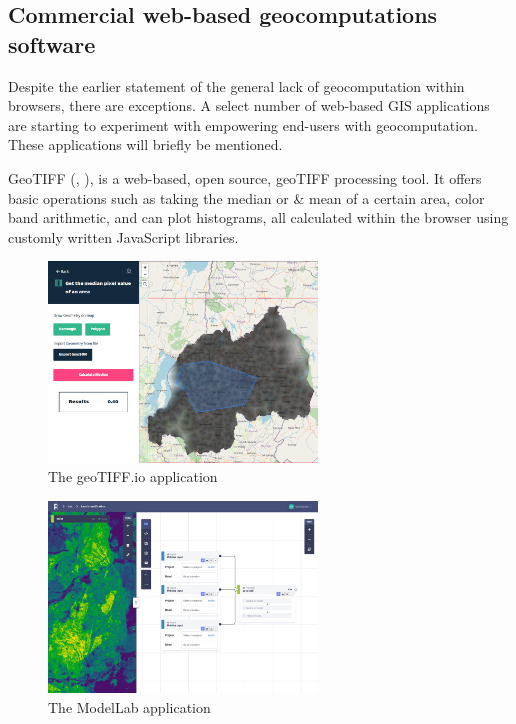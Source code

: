 \subsection{Commercial web-based geocomputations software}

Despite the earlier statement of the general lack of \ac{geocomputation} within browsers, there are exceptions. 
A select number of web-based \ac{GIS} applications are starting to experiment with empowering end-users with geocomputation. 
These applications will briefly be mentioned.
 
GeoTIFF (\citep{dufour_geotiffio_2022}, ), is a web-based, open source, geoTIFF processing tool. 
It offers basic operations such as taking the median or \& mean of a certain area, color band arithmetic, and can plot histograms, all calculated within the browser using customly written JavaScript libraries.

\begin{figure}
  \centering
  \graphicspath{ {../../assets/images/background/geo-web/} }
  \includegraphics[width=270px]{geotiff.png}
  \caption{The geoTIFF.io application \citep{dufour_geotiffio_2022}}
  \label{fig:geotiff}
\end{figure}

\begin{figure}
  \centering
  \graphicspath{ {../../assets/images/background/geo-web/} }
  \includegraphics[width=270px]{rasterfoundry-2.jpg}
  \caption{The ModelLab application \citep{azavea_geotrellis_2022}}
  \label{fig:modellab}
\end{figure}

